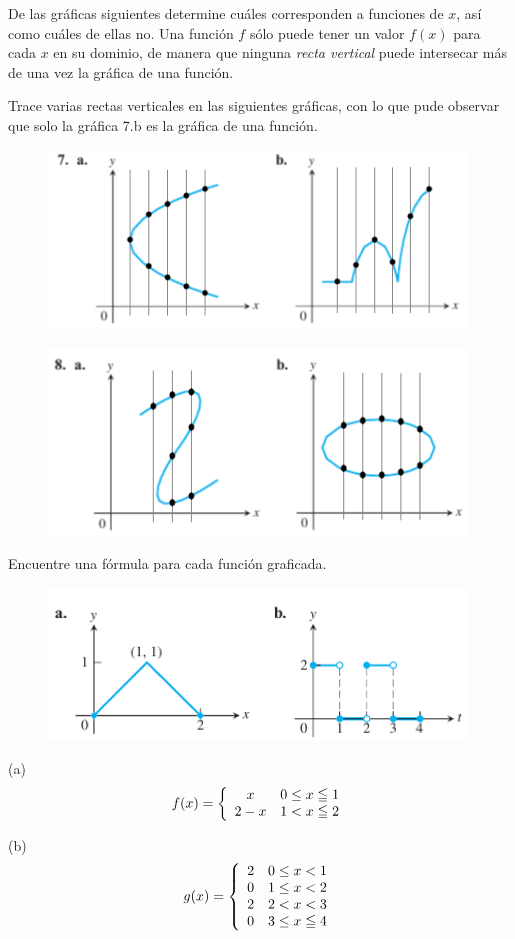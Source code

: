 \documentclass[12pt, letterpaper]{article}
\begin{document}
De las gráficas siguientes determine cuáles corresponden a funciones de  $x$, así como cuáles de ellas no.
Una función $f$ sólo puede tener un valor $f(x)$ para cada $x$ en su dominio, de manera que ninguna \textit{recta vertical} puede intersecar más de una vez la gráfica de una función.

Trace varias rectas verticales en las siguientes gráficas, con lo que pude observar  que solo la gráfica 7.b es la gráfica de una función.
\begin{figure}[h]
\centering
\includegraphics[width=30em]{siete}
\end{figure} 

\begin{figure}[h]
\centering
\includegraphics[width=30em]{ocho}
\end{figure} 

\newpage

Encuentre una fórmula para cada función graficada.
\begin{figure}[h]
\centering
\includegraphics[width=30em]{veinticiete}
\end{figure} 

(a)
$$f(x) = \left\{
\begin{array}{c l}
 x & 0 \leq x \leqq 1\\
 2-x & 1< x \leqq 2
\end{array}
\right.
$$

(b)
$$g(x) = \left\{
\begin{array}{c l}
 2 & 0 \leq x < 1\\
 0 & 1 \leq x < 2\\
 2 & 2 < x < 3\\
 0 & 3 \leq x \leqq 4
\end{array}
\right.
$$
\end{document}
